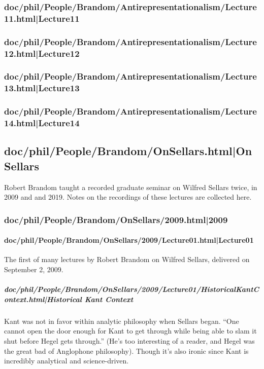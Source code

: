 \documentclass[12pt,a4paper]{report}
\begin{document}
\subsubsection{doc/phil/People/Brandom/Antirepresentationalism/Lecture11.html|Lecture11}

\subsubsection{doc/phil/People/Brandom/Antirepresentationalism/Lecture12.html|Lecture12}

\subsubsection{doc/phil/People/Brandom/Antirepresentationalism/Lecture13.html|Lecture13}

\subsubsection{doc/phil/People/Brandom/Antirepresentationalism/Lecture14.html|Lecture14}

\subsection{doc/phil/People/Brandom/OnSellars.html|On Sellars}
Robert Brandom taught a recorded graduate seminar on Wilfred Sellars twice, in 2009 and and 2019. Notes on the recordings of these lectures are collected here.
\subsubsection{doc/phil/People/Brandom/OnSellars/2009.html|2009}

\paragraph{doc/phil/People/Brandom/OnSellars/2009/Lecture01.html|Lecture01}
The first of many lectures by Robert Brandom on Wilfred Sellars, delivered on September 2, 2009.

\subparagraph{doc/phil/People/Brandom/OnSellars/2009/Lecture01/HistoricalKantContext.html|Historical Kant Context}
Kant was not in favor within analytic philosophy when Sellars began. ``One cannot open the door enough for Kant to get through while being able to slam it shut before Hegel gets through.'' (He's too interesting of a reader, and Hegel was the great bad of Anglophone philosophy). Though it's also ironic since Kant is incredibly analytical and science-driven.
\end{document}
